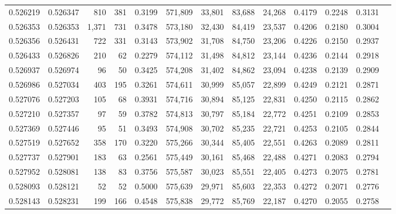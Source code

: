 \begin{tabular}{rrrrrrrrrrrrr}
0.526219 & 0.526347 &   810 &   381 &                                     0.3199 & 571,809 &  33,801 &  83,688 &  24,268 & 0.4179 & 0.2248 & 0.3131 \\
0.526353 & 0.526353 & 1,371 &   731 &                                     0.3478 & 573,180 &  32,430 &  84,419 &  23,537 & 0.4206 & 0.2180 & 0.3004 \\
0.526356 & 0.526431 &   722 &   331 &                                     0.3143 & 573,902 &  31,708 &  84,750 &  23,206 & 0.4226 & 0.2150 & 0.2937 \\
0.526433 & 0.526826 &   210 &    62 &                                     0.2279 & 574,112 &  31,498 &  84,812 &  23,144 & 0.4236 & 0.2144 & 0.2918 \\
0.526937 & 0.526974 &    96 &    50 &                                     0.3425 & 574,208 &  31,402 &  84,862 &  23,094 & 0.4238 & 0.2139 & 0.2909 \\
0.526986 & 0.527034 &   403 &   195 &                                     0.3261 & 574,611 &  30,999 &  85,057 &  22,899 & 0.4249 & 0.2121 & 0.2871 \\
0.527076 & 0.527203 &   105 &    68 &                                     0.3931 & 574,716 &  30,894 &  85,125 &  22,831 & 0.4250 & 0.2115 & 0.2862 \\
0.527210 & 0.527357 &    97 &    59 &                                     0.3782 & 574,813 &  30,797 &  85,184 &  22,772 & 0.4251 & 0.2109 & 0.2853 \\
0.527369 & 0.527446 &    95 &    51 &                                     0.3493 & 574,908 &  30,702 &  85,235 &  22,721 & 0.4253 & 0.2105 & 0.2844 \\
0.527519 & 0.527652 &   358 &   170 &                                     0.3220 & 575,266 &  30,344 &  85,405 &  22,551 & 0.4263 & 0.2089 & 0.2811 \\
0.527737 & 0.527901 &   183 &    63 &                                     0.2561 & 575,449 &  30,161 &  85,468 &  22,488 & 0.4271 & 0.2083 & 0.2794 \\
0.527952 & 0.528081 &   138 &    83 &                                     0.3756 & 575,587 &  30,023 &  85,551 &  22,405 & 0.4273 & 0.2075 & 0.2781 \\
0.528093 & 0.528121 &    52 &    52 &                                     0.5000 & 575,639 &  29,971 &  85,603 &  22,353 & 0.4272 & 0.2071 & 0.2776 \\
0.528143 & 0.528231 &   199 &   166 &                                     0.4548 & 575,838 &  29,772 &  85,769 &  22,187 & 0.4270 & 0.2055 & 0.2758 \\

\end{tabular}
